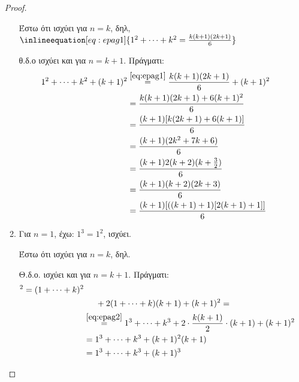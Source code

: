 \begin{multicols}{2}
\begin{enumerate}
\begin{proof}
\begin{enumerate}
            Έστω ότι ισχύει για $n=k$, δηλ, 
            $ \inlineequation[eq:epag1]{1^{2} + \cdots + k^{2} = 
            \frac{k (k+1)(2k+1)}{6}} $

            θ.δ.ο ισχύει και για $ n=k+1 $. Πράγματι:
            \begin{align*}
              1^{2} + \cdots + k^{2} + (k+1)^{2} 
                        &\overset{\eqref{eq:epag1}}{=}\frac{k(k+1)(2k+1)}{6} 
                        + (k+1)^{2} \\
                        &= \frac{k(k+1)(2k+1)+6(k+1)^{2}}{6} \\
                        &= \frac{(k+1)[k(2k+1)+6(k+1)]}{6} \\
                        &= \frac{(k+1)(2k^{2}+7k+6)}{6} \\
                        &= \frac{(k+1)2(k+2)(k+ \frac{3}{2})}{6} \\
                        &= \frac{(k+1)(k+2)(2k+3)}{6} \\
                        &= \frac{(k+1)[((k+1)+1)[2(k+1)+1]]}{6} 
            \end{align*}
          \item Για $ n=1 $, έχω: $ 1^{3} = 1^{2} $, ισχύει.

            Έστω ότι ισχύει για $ n=k $, δηλ. 

            Θ.δ.ο. ισχύει και για $ n=k+1 $. Πράγματι:
            \begin{align*}
              [1+ \cdots &+ k + (k+1)]^{2} 
              = (1+\cdots + k)^{2} \\
                         & \hspace{0.5cm} + 2(1+\cdots + k)(k+1) + (k+1)^{2} = \\
                         &\overset{\eqref{eq:epag2}}{=} 1^{3}+\cdots +k^{3} + 2\cdot 
                         \frac{k(k+1)}{2}\cdot (k+1) + (k+1)^{2} \\
                         &=1^{3}+\cdots +k^{3}+(k+1)^{2}(k+1) \\
                         &= 1^{3}+\cdots +k^{3}+(k+1)^{3}
            \end{align*} 
        \end{enumerate}
      \end{proof}


\end{enumerate}
\end{multicols}
